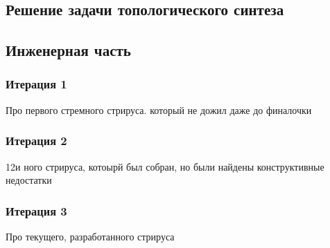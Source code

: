

\subsection{Решение задачи топологического
синтеза}


\subsection{Инженерная
часть}


\subsubsection{Итерация
1}

Про первого стремного стрируса. который не дожил даже до финалочки


\subsubsection{Итерация
2}

12и ного стрируса, котоырй был собран, но были найдены конструктивные
недостатки


\subsubsection{Итерация
3}

Про текущего, разработанного стрируса